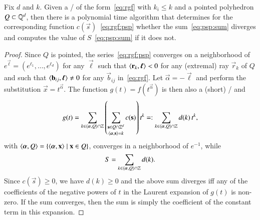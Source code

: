 \begin{proposition}
Fix $d$ and $k$.
Given a \rgf/ of the form~\eqref{eq:rgf} with $k_i \le k$
and a pointed polyhedron $Q \subset \mathbb{Q}^d$, then there is a
polynomial time algorithm that determines for the corresponding
function $c(\vec s)$~\eqref{eq:rgf:psp} whether the sum~\eqref{eq:psp:sum}
diverges and computes the value of $S$~\eqref{eq:psp:sum} if it does not.
\end{proposition}
\begin{proof}
Since $Q$ is pointed, the series~\eqref{eq:rgf:psp} converges on a neighborhood
of $e^{\vec \ell} = (e^{\ell_1}, \ldots, e^{\ell_d})$ for any $\vec \ell$
such that $\sps {\vec r_k} {\vec \ell} < 0$ for
any (extremal) ray $\vec r_k$ of $Q$ and
such that $\sps {\vec b_{i j}} {\vec \ell} \ne 0$ for any
$\vec b_{i j}$ in~\eqref{eq:rgf}.
Let $\vec \alpha = - \vec \ell$ and perform the substitution
$\vec x = t^{\vec \alpha}$.  The function $g(t) = f(t^{\vec \alpha})$
is then also a (short) \rgf/ and
$$
g(t) = \sum_{k \in \sps {\vec\alpha} Q \cap \ZZ}
	\left(
		\sum_{\shortstack{$\scriptstyle \vec s \in Q \cap \ZZ^d$\\
				  $\scriptstyle \sp \alpha s = k$}} c(\vec s)
	\right) t^k
=: \sum_{k \in \sps {\vec\alpha} Q \cap \ZZ} d(k) \, t^k
,
$$
with $\sps {\vec\alpha} Q = \{ \sp \alpha x \mid \vec x \in Q \}$,
converges in a neighborhood of $e^{-1}$, while
$$
S = \sum_{k \in \sps {\vec\alpha} Q \cap \ZZ} d(k)
.
$$
Since $c(\vec s) \ge 0$, we have $d(k) \ge 0$
and the above sum diverges iff any of the coefficients of the
negative powers of $t$ in the Laurent expansion of $g(t)$ is non-zero.
If the sum converges, then the sum is simply the coefficient
of the constant term in this expansion.


\end{proof}
